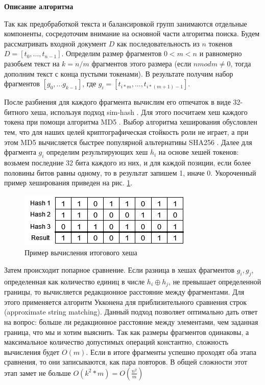 \documentclass[14pt]{matmex-diploma-custom}
\begin{document}
\textbf{Описание алгоритма}

Так как предобработкой текста и балансировкой групп занимаются отдельные компоненты, сосредоточим внимание на основной части алгоритма поиска. Будем рассматривать входной документ $D$ как последовательность из $n$ токенов $D = [t_0,...,t_{n-1}]$. Определим размер фрагментов $0 < m < n$ и равномерно разобьем текст на $k = n / m$ фрагментов этого размера (если $n mod m \ne 0$, тогда дополним текст с конца пустыми токенами). В результате получим набор фрагментов $[g_0,...g_{k-1}]$, где $g_i = [t_{i * m},...,t_{i * (m + 1) - 1}]$. 

После разбиения для каждого фрагмента вычислим его отпечаток в виде 32-битного хеша, используя подход sim-hash \cite{bib:art:SimHash}. Для этого посчитаем хеш каждого токена при помощи алгоритма MD5 \cite{bib:art:MD5}. Выбор алгоритма хеширования обусловлен тем, что для наших целей криптографическая стойкость роли не играет, а при этом MD5 вычисляется быстрее популярной альтернативы SHA256 \cite{bib:art:MD5vsSHA256}. Далее для фрагмента $g_i$ определим результирующих хеш $h_i$ на основе хешей токенов: возьмем последние 32 бита каждого из них, и для каждой позиции, если более половины битов равны одному, то в результат запишем 1, иначе 0. Укороченный пример хеширования приведен на рис. \ref{fig:Hashing}.

\begin{figure}[h!]
	\includegraphics[scale=1]{pictures/Hash.png}
	\centering
	\caption{Пример вычисления итогового хеша}
	\label{fig:Hashing}
\end{figure}

Затем происходит попарное сравнение. Если разница в хешах фрагментов $g_i, g_j$, определенная как количество единиц в числе $h_i \oplus h_j$, не превышает определенной границы, то вычисляется редакционное расстояние между фрагментами. Для этого применяется алгоритм Укконена \cite{bib:art:UkkonenASM} для приблизительного сравнения строк (approximate string matching). Данный подход позволяет оптимально дать ответ на вопрос: больше ли редакционное расстояние между элементами, чем заданная граница, что мы и хотим выяснить. Так как размеры фрагментов одинаковы, а максимальное количество допустимых операций константно, сложность вычисления будет $O(m)$. Если в итоге фрагменты успешно проходят оба этапа сравнения, то они записываются, как пара повторов. В общей сложности этот этап замет не больше $O(k^2 * m) = O(\frac{n^2}{m})$
\end{document}
